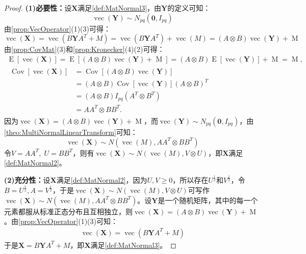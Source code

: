 \begin{proof}
	\textbf{(1)必要性：}设$\mathbf{X}$满足\cref{def:MatNormal3}，由$\mathbf{Y}$的定义可知：
	\begin{equation*}
		\operatorname{vec}(\mathbf{Y})\sim N_{pq}(\mathbf{0},I_{pq})
	\end{equation*}
	由\cref{prop:VecOperator}(1)(3)可得：
	\begin{equation*}
		\operatorname{vec}(\mathbf{X})=\operatorname{vec}(B\mathbf{Y}A^T+M)=\operatorname{vec}(B\mathbf{Y}A^T)+\operatorname{vec}(M)=(A\otimes B)\operatorname{vec}(\mathbf{Y})+\operatorname{M}
	\end{equation*}
	由\cref{prop:CovMat}(3)和\cref{prop:Kronecker}(4)(2)可得：
	\begin{gather*}
		\operatorname{E}[\operatorname{vec}(\mathbf{X})] 
		= \operatorname{E}[(A \otimes B)\operatorname{vec}(\mathbf{Y}) + \operatorname{M}] 
		= (A \otimes B)\operatorname{E}[\operatorname{vec}(\mathbf{Y})] + \operatorname{M} 
		= \operatorname{M}, \\[1ex]
		\begin{aligned}
			\operatorname{Cov}[\operatorname{vec}(\mathbf{X})] 
			&= \operatorname{Cov}[(A \otimes B)\operatorname{vec}(\mathbf{Y})] \\
			&= (A \otimes B)\operatorname{Cov}[\operatorname{vec}(\mathbf{Y})](A \otimes B)^T \\
			&= (A \otimes B)I_{pq}(A^T \otimes B^T) \\
			&= AA^T \otimes BB^T.
		\end{aligned}
	\end{gather*}
	因为$\operatorname{vec}(\mathbf{X})=(A\otimes B)\operatorname{vec}(\mathbf{Y})+\operatorname{M}$，而$\operatorname{vec}(\mathbf{Y})\sim N_{pq}(\mathbf{0},I_{pq})$，由\cref{theo:MultiNormalLinearTransform}可知：
	\begin{equation*}
		\operatorname{vec}(\mathbf{X})\sim N(\operatorname{vec}(M),AA^T\otimes BB^T)
	\end{equation*}
	令$V=AA^T,\;U=BB^T$，则有$\operatorname{vec}(\mathbf{X})\sim N(\operatorname{vec}(M),V\otimes U)$，即$\mathbf{X}$满足\cref{def:MatNormal2}。\par
	\textbf{(2)充分性：}设$\mathbf{X}$满足\cref{def:MatNormal2}，因为$U,V\geqslant0$，所以存在$U^{\frac{1}{2}}$和$V^{\frac{1}{2}}$，令$B=U^{\frac{1}{2}},A=V^{\frac{1}{2}}$，于是$\operatorname{vec}(\mathbf{X})\sim N(\operatorname{vec}(M),V\otimes U)$可写作$\operatorname{vec}(\mathbf{X})\sim N(\operatorname{vec}(M),AA^T\otimes BB^T)$。设$\mathbf{Y}$是一个随机矩阵，其中的每一个元素都服从标准正态分布且互相独立，则$\operatorname{vec}(\mathbf{X})=(A\otimes B)\operatorname{vec}(\mathbf{Y})+\operatorname{M}$。由\cref{prop:VecOperator}(1)(3)可知：
	\begin{gather*}
		\operatorname{vec}(\mathbf{X})=\operatorname{vec}(B\mathbf{Y}A^T+M)
	\end{gather*}
	于是$\mathbf{X}=B\mathbf{Y}A^T+M$，即$\mathbf{X}$满足\cref{def:MatNormal3}。
\end{proof}
